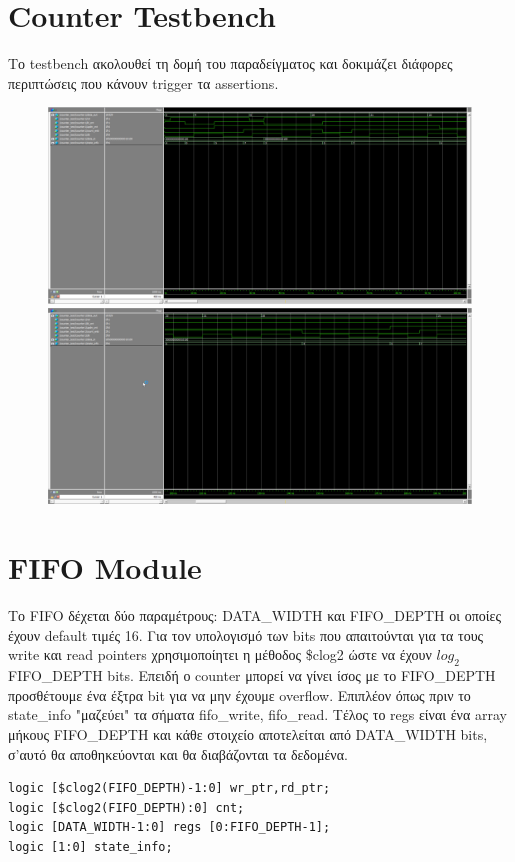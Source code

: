 \documentclass[12pt]{article}
\begin{document}
\section*{Counter Testbench}
Το testbench ακολουθεί τη δομή του παραδείγματος και δοκιμάζει διάφορες περιπτώσεις που κάνουν trigger τα assertions.
\begin{figure}
\vspace*{-1cm}
\includegraphics[width=\textwidth,height=.7\textheight,keepaspectratio]{counter_1.png} 
\includegraphics[width=\textwidth,height=.7\textheight,keepaspectratio]{counter_2.png}
\end{figure}
\section*{FIFO Module}
Το FIFO δέχεται δύο παραμέτρους: DATA\_WIDTH και FIFO\_DEPTH οι οποίες έχουν default τιμές 16. Για τον υπολογισμό
των bits που απαιτούνται για τα τους write και read pointers χρησιμοποίητει η μέθοδος \$clog2 ώστε να έχουν
$log_2$ FIFO\_DEPTH bits. Επειδή ο counter μπορεί να
γίνει ίσος με το FIFO\_DEPTH προσθέτουμε ένα έξτρα bit για να μην έχουμε overflow. Επιπλέον όπως πριν το state\_info
"μαζεύει" τα σήματα fifo\_write, fifo\_read. Τέλος το regs είναι ένα array μήκους FIFO\_DEPTH και κάθε στοιχείο
αποτελείται από DATA\_WIDTH bits, σ'αυτό θα αποθηκεύονται και θα διαβάζονται τα δεδομένα. 
\begin{verbatim} 
logic [$clog2(FIFO_DEPTH)-1:0] wr_ptr,rd_ptr;
logic [$clog2(FIFO_DEPTH):0] cnt;
logic [DATA_WIDTH-1:0] regs [0:FIFO_DEPTH-1];
logic [1:0] state_info;
\end{verbatim}
\end{document}
